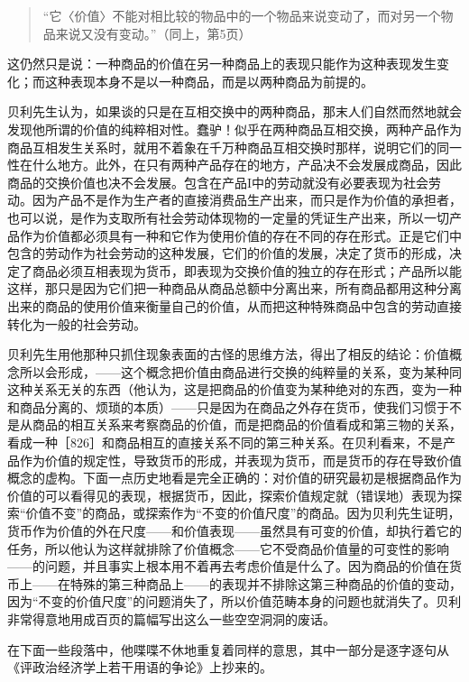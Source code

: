 \begin{quote}{“它〈价值〉不能对相比较的物品中的一个物品来说变动了，而对另一个物品来说又没有变动。”（同上，第5页）}\end{quote}

这仍然只是说：一种商品的价值在另一种商品上的表现只能作为这种表现发生变化；而这种表现本身不是以一种商品，而是以两种商品为前提的。

贝利先生认为，如果谈的只是在互相交换中的两种商品，那末人们自然而然地就会发现他所谓的价值的纯粹相对性。蠢驴！似乎在两种商品互相交换，两种产品作为商品互相发生关系时，就用不着象在千万种商品互相交换时那样，说明它们的同一性在什么地方。此外，在只有两种产品存在的地方，产品决不会发展成商品，因此商品的交换价值也决不会发展。包含在产品I中的劳动就没有必要表现为社会劳动。因为产品不是作为生产者的直接消费品生产出来，而只是作为价值的承担者，也可以说，是作为支取所有社会劳动体现物的一定量的凭证生产出来，所以一切产品作为价值都必须具有一种和它作为使用价值的存在不同的存在形式。正是它们中包含的劳动作为社会劳动的这种发展，它们的价值的发展，决定了货币的形成，决定了商品必须互相表现为货币，即表现为交换价值的独立的存在形式；产品所以能这样，那只是因为它们把一种商品从商品总额中分离出来，所有商品都用这种分离出来的商品的使用价值来衡量自己的价值，从而把这种特殊商品中包含的劳动直接转化为一般的社会劳动。

贝利先生用他那种只抓住现象表面的古怪的思维方法，得出了相反的结论：价值概念所以会形成，——这个概念把价值由商品进行交换的纯粹量的关系，变为某种同这种关系无关的东西（他认为，这是把商品的价值变为某种绝对的东西，变为一种和商品分离的、烦琐的本质）——只是因为在商品之外存在货币，使我们习惯于不是从商品的相互关系来考察商品的价值，而是把商品的价值看成和第三物的关系，看成一种［826］和商品相互的直接关系不同的第三种关系。在贝利看来，不是产品作为价值的规定性，导致货币的形成，并表现为货币，而是货币的存在导致价值概念的虚构。下面一点历史地看是完全正确的：对价值的研究最初是根据商品作为价值的可以看得见的表现，根据货币，因此，探索价值规定就（错误地）表现为探索“价值不变”的商品，或探索作为“不变的价值尺度”的商品。因为贝利先生证明，货币作为价值的外在尺度——和价值表现——虽然具有可变的价值，却执行着它的任务，所以他认为这样就排除了价值概念——它不受商品价值量的可变性的影响——的问题，并且事实上根本用不着再去考虑价值是什么了。因为商品的价值在货币上——在特殊的第三种商品上——的表现并不排除这第三种商品的价值的变动，因为“不变的价值尺度”的问题消失了，所以价值范畴本身的问题也就消失了。贝利非常得意地用成百页的篇幅写出这么一些空空洞洞的废话。

在下面一些段落中，他喋喋不休地重复着同样的意思，其中一部分是逐字逐句从《评政治经济学上若干用语的争论》上抄来的。

